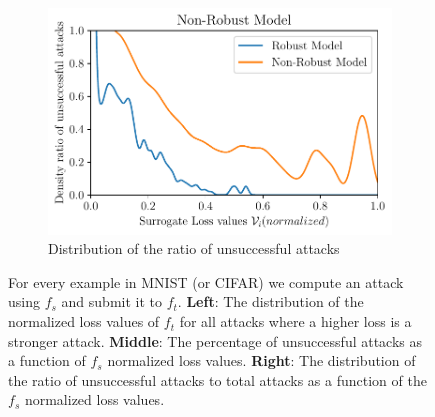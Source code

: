 \begin{figure}[h]
\begin{subfigure}[b]{0.32\columnwidth}
    \includegraphics[width=\textwidth]{Figures/histogram_Vi.pdf}
    \caption{\small Distribution of the ratio of unsuccessful attacks}
    \label{fig:histogram_Vi}
    \end{subfigure}
    \caption{\small For every example in MNIST (or CIFAR) we compute an attack using $f_s$ and submit it to $f_t$. \textbf{Left}: The distribution of the normalized loss values of $f_t$ for all attacks where a higher loss is a stronger attack. \textbf{Middle}: The percentage of unsuccessful attacks as a function of $f_s$ normalized loss values. \textbf{Right}: The distribution of the ratio of unsuccessful attacks to total attacks as a function of the $f_s$ normalized loss values.}
    \label{fig:fgsm_vs_pgd}
\end{figure}
\vspace{-20pt}